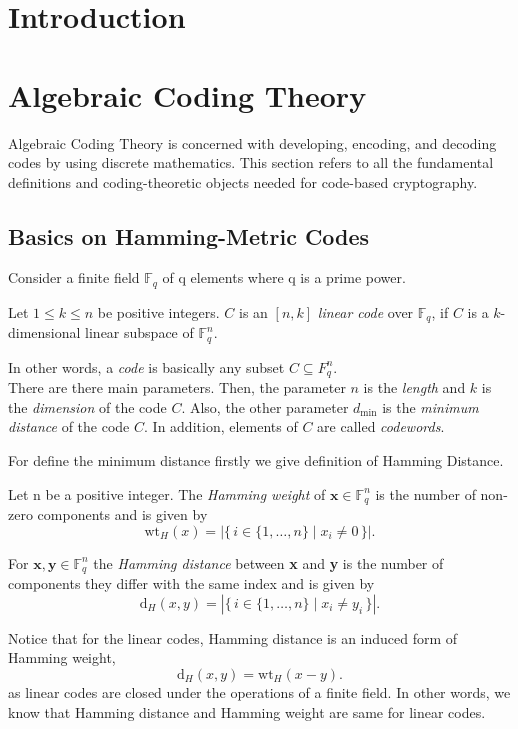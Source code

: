 \section{Introduction}

\section{Algebraic Coding Theory}
\label{sec:algeb_coding}
Algebraic Coding Theory is concerned with developing, encoding, and decoding codes by using discrete mathematics. This section refers to all the fundamental definitions and coding-theoretic objects needed for code-based cryptography. 

\subsection{Basics on Hamming-Metric Codes}
Consider a finite field $\mathbb F_q$ of q elements where q is a prime power.
\begin{definition} Let $1 \leq k \leq n$ be positive integers. $C$ is an $[n, k]$ \textit{linear code} over $\mathbb F_q$, if $C$ is a $k$-dimensional linear subspace of $\mathbb F_q^n$.
\end{definition}

\noindent In other words, a \textit{code} is basically any subset $C \subseteq F_q^n$.
\\[0.4cm]
There are there main parameters. Then, the parameter $n$ is the \textit{length} and $k$ is the \textit{dimension} of the code $C$. Also, the other parameter $d_{\min}$ is the \textit{minimum distance} of the code $C$. In addition, elements of $C$ are called \textit{codewords}. 

For define the minimum distance firstly we give definition of Hamming Distance. 

\begin{definition}
Let n be a positive integer. The \textit{Hamming weight} of 
$\textbf{x} \in \mathbb F_q^n$ is the number of non-zero components and is given by
\[
\mathrm{wt}_H(x) = 
\left| \{\, i \in \{1, \dots, n\} 
\mid x_i \neq 0 \,\} \right|.
\]
\end{definition}

\begin{definition}
For $\textbf{x}, \textbf{y} \in \mathbb F_q^n$ the \textit{Hamming distance} between \textbf{x} and \textbf{y} is the number of components they differ with the same index and is given by
\[
\mathrm{d}_H(x, y) =
\left| \{\, i \in \{1, \dots, n\} 
\mid x_i \neq y_i \,\} \right|.
\]    
\end{definition}
\noindent Notice that for the linear codes, Hamming distance is an induced form of Hamming weight,
\[
\mathrm{d}_H(x, y) = \mathrm{wt}_H(x-y).
\]
as linear codes are closed under the operations of a finite field. In other words, we know that Hamming distance and Hamming weight are same for linear codes.

